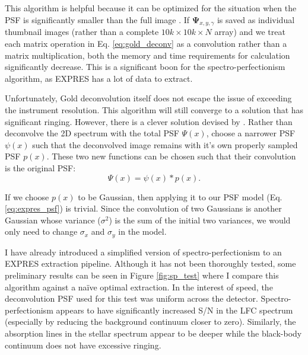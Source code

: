 \documentclass[11pt]{article}
\begin{document}
This algorithm is helpful because it can be optimized for the situation when the PSF is significantly smaller than the full image \citep{Morhac2003}. If $\mathbf{\Psi}_{x,y,\gamma}$ is saved as individual thumbnail images (rather than a complete $10k \times 10k \times N$ array) and we treat each matrix operation in Eq. \ref{eq:gold_deconv} as a convolution rather than a matrix multiplication, both the memory and time requirements for calculation significantly decrease. This is a significant boon for the spectro-perfectionism algorithm, as EXPRES has a lot of data to extract.

Unfortunately, Gold deconvolution itself does not escape the issue of exceeding the instrument resolution. This algorithm will still converge to a solution that has significant ringing. However, there is a clever solution devised by \citet{Magain1998}. Rather than deconvolve the 2D spectrum with the total PSF $\Psi(x)$, choose a narrower PSF $\psi(x)$ such that the deconvolved image remains with it's own properly sampled PSF $p(x)$. These two new functions can be chosen such that their convolution is the original PSF:
\begin{equation}
    \Psi(x) = \psi(x) * p(x).
\end{equation}

If we choose $p(x)$ to be Gaussian, then applying it to our PSF model (Eq. \ref{eq:expres_psf}) is trivial. Since the convolution of two Gaussians is another Gaussian whose variance ($\sigma^2$) is the sum of the initial two variances, we would only need to change $\sigma_x$ and $\sigma_y$ in the model.

I have already introduced a simplified version of spectro-perfectionism to an EXPRES extraction pipeline. Although it has not been thoroughly tested, some preliminary results can be seen in Figure \ref{fig:sp_test} where I compare this algorithm against a na\"ive optimal extraction. In the interest of speed, the deconvolution PSF used for this test was uniform across the detector. Spectro-perfectionism appears to have significantly increased S/N in the LFC spectrum (especially by reducing the background continuum closer to zero). Similarly, the absorption lines in the stellar spectrum appear to be deeper while the black-body continuum does not have excessive ringing.
\end{document}
